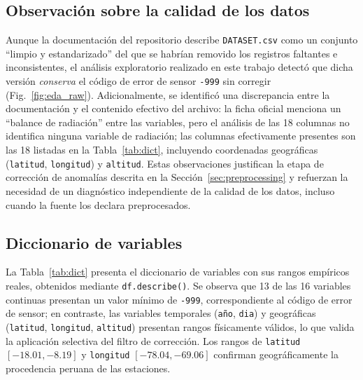\subsection{Observación sobre la calidad de los datos}
Aunque la documentación del repositorio describe \texttt{DATASET.csv} como un
conjunto ``limpio y estandarizado'' del que se habrían removido los registros
faltantes e inconsistentes, el análisis exploratorio realizado en este trabajo
detectó que dicha versión \emph{conserva} el código de error de sensor
\texttt{-999} sin corregir (Fig.~\ref{fig:eda_raw}). Adicionalmente, se identificó
una discrepancia entre la documentación y el contenido efectivo del archivo: la
ficha oficial menciona un ``balance de radiación'' entre las variables, pero el
análisis de las 18 columnas no identifica ninguna variable de radiación; las
columnas efectivamente presentes son las 18 listadas en la Tabla~\ref{tab:dict},
incluyendo coordenadas geográficas (\texttt{latitud}, \texttt{longitud}) y
\texttt{altitud}. Estas observaciones justifican la etapa de corrección de
anomalías descrita en la Sección~\ref{sec:preprocessing} y refuerzan la necesidad
de un diagnóstico independiente de la calidad de los datos, incluso cuando la
fuente los declara preprocesados.

\subsection{Diccionario de variables}
La Tabla~\ref{tab:dict} presenta el diccionario de variables con sus rangos
empíricos reales, obtenidos mediante \texttt{df.describe()}. Se observa que 13 de
las 16 variables continuas presentan un valor mínimo de \texttt{-999},
correspondiente al código de error de sensor; en contraste, las variables
temporales (\texttt{año}, \texttt{dia}) y geográficas (\texttt{latitud},
\texttt{longitud}, \texttt{altitud}) presentan rangos físicamente válidos, lo que
valida la aplicación selectiva del filtro de corrección. Los rangos de
\texttt{latitud} $[-18.01, -8.19]$ y \texttt{longitud} $[-78.04, -69.06]$
confirman geográficamente la procedencia peruana de las estaciones.

